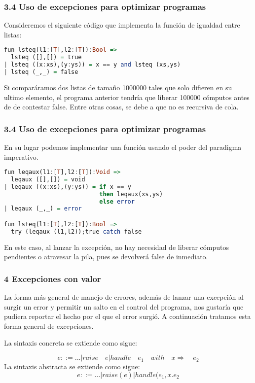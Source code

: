 \documentclass[xcolor=dvipsnames,table,spanish]{beamer}
\begin{document}
\begin{frame}[fragile]
\frametitle{3.4 Uso de excepciones para optimizar programas}
Consideremos el siguiente código que implementa la función de igualdad entre listas:

\begin{lstlisting}[language=Haskell]
fun lsteq(l1:[T],l2:[T]):Bool =>
  lsteq ([],[]) = true
| lsteq ((x:xs),(y:ys)) = x == y and lsteq (xs,ys)
| lsteq (_,_) = false
\end{lstlisting}

Si comparáramos dos listas de tamaño 1000000 tales que solo difieren en su ultimo elemento, el programa anterior tendría que liberar 100000 cómputos antes de de contestar false. Entre otras cosas, se debe a que no es recursiva de cola.
\end{frame}
\begin{frame}[fragile]
\frametitle{3.4 Uso de excepciones para optimizar programas}
En su lugar podemos implementar una función usando el poder del paradigma imperativo.

\begin{lstlisting}[language=Haskell]
fun leqaux(l1:[T],l2:[T]):Void =>
  leqaux ([],[]) = void
| leqaux ((x:xs),(y:ys)) = if x == y
                           then leqaux(xs,ys)
                           else error
| leqaux (_,_) = error

fun lsteq(l1:[T],l2:[T]):Bool =>
  try (leqaux (l1,l2));true catch false
\end{lstlisting}

En este caso, al lanzar la excepción, no hay necesidad de liberar cómputos pendientes o atravesar la pila, pues se devolverá false de inmediato.
\end{frame}
\begin{frame}
\frametitle{4 Excepciones con valor}
La forma más general de manejo de errores, además de lanzar una excepción al surgir un error y permitir un salto en el control del programa, nos gustaría que  pudiera reportar el hecho por el que el error surgió. A continuación tratamos esta forma general de excepciones.
\end{frame}

\begin{frame}

La sintaxis concreta se extiende como sigue:

\[e::=...|raise \quad e|handle \quad e_1 \quad with \quad x \Rightarrow \quad e_2\]
\newline
La sintaxis abstracta se extiende como sigue:
\[e::=...|raise(e)|handle(e_1,x.e_2\]
\end{frame}
\begin{frame}

\end{frame}
\begin{frame}

\end{frame}
\end{document}
